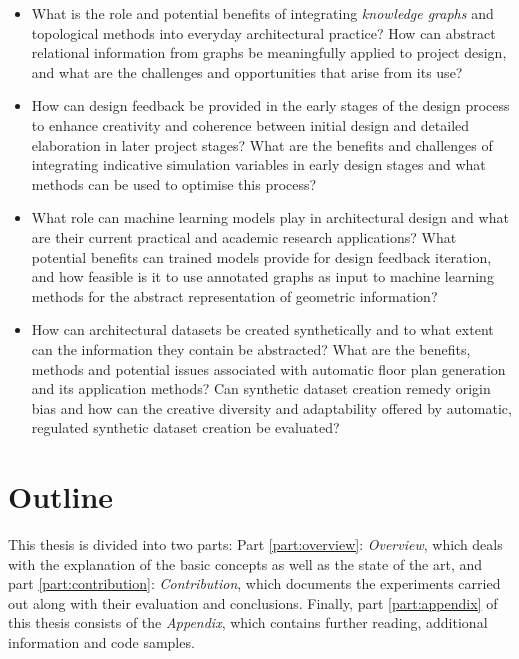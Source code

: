 \documentclass[a4paper, 12pt]{report}
\begin{document}
\begin{itemize}

\item What is the role and potential benefits of integrating \textit{\glspl{knowledge graph}} and topological methods into everyday architectural practice? How can abstract relational information from graphs be meaningfully applied to project design, and what are the challenges and opportunities that arise from its use?

\item How can design feedback be provided in the early stages of the design process to enhance creativity and coherence between initial design and detailed elaboration in later project stages? What are the benefits and challenges of integrating indicative simulation variables in early design stages and what methods can be used to optimise this process?

\item What role can machine learning models play in architectural design and what are their current practical and academic research applications? What potential benefits can trained models provide for design feedback iteration, and how feasible is it to use annotated graphs as input to machine learning methods for the abstract representation of geometric information?

\item How can architectural datasets be created synthetically and to what extent can the information they contain be abstracted? What are the benefits, methods and potential issues associated with automatic floor plan generation and its application methods? Can synthetic dataset creation remedy \gls{origin bias} and how can the creative diversity and adaptability offered by automatic, regulated synthetic dataset creation be evaluated?

\end{itemize}

\section{Outline}\label{sec:outline}

This thesis is divided into two parts: Part \ref{part:overview}: \emph{Overview}, which deals with the explanation of the basic concepts as well as the state of the art, and part \ref{part:contribution}: \emph{Contribution}, which documents the experiments carried out along with their evaluation and conclusions. Finally, part \ref{part:appendix} of this thesis consists of the \emph{Appendix}, which contains further reading, additional information and code samples.
\end{document}
